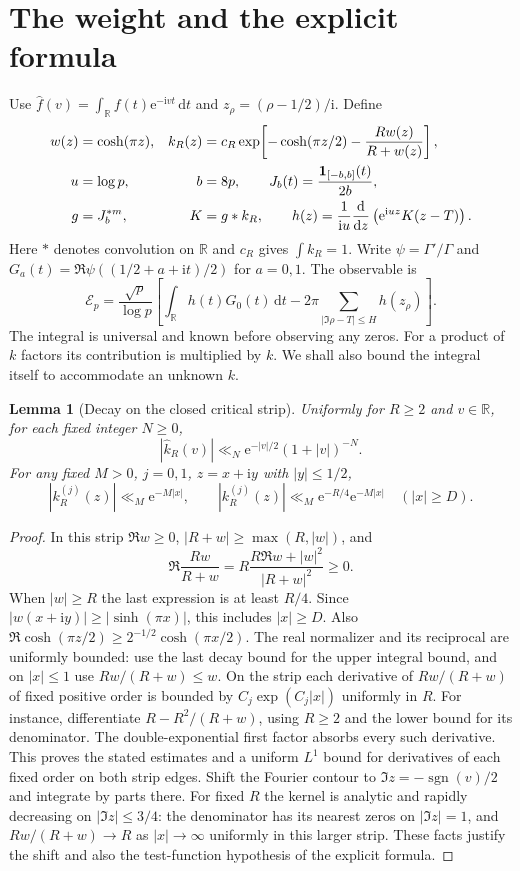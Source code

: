 \documentclass[11pt]{article}
\newtheorem{lemma}[theorem]{Lemma}
\newcommand{\R}{\mathbb R}
\newcommand{\ee}{\mathrm e}
\newcommand{\ii}{\mathrm i}
\newcommand{\dd}{\,\mathrm d}
\newcommand{\wh}{\widehat}
\begin{document}
\section{The weight and the explicit formula}
Use $\wh f(v)=\int_{\R}f(t)\ee^{-\ii vt}\dd t$ and $z_\rho=(\rho-1/2)/\ii$. Define
\begin{align}
 w(z)&=\cosh(\pi z),&
 k_R(z)&=c_R\exp\!\left[-\cosh(\pi z/2)-\frac{Rw(z)}{R+w(z)}\right],
 \label{kernel}\\
 u&=\log p,& b&=8p,\qquad J_b(t)=\frac{\mathbf 1_{[-b,b]}(t)}{2b},\notag\\
 g&=J_b^{*m},& K&=g*k_R,\qquad
 h(z)=\frac{1}{\ii u}\frac{\mathrm d}{\mathrm dz}\left(\ee^{\ii uz}K(z-T)\right).
 \label{hdef}
\end{align}
Here $*$ denotes convolution on $\R$ and $c_R$ gives $\int k_R=1$. Write $\psi=\Gamma'/\Gamma$ and $G_a(t)=\Re\psi((1/2+a+\ii t)/2)$ for $a=0,1$. The observable is
\begin{equation}\label{statistic}
 \boxed{\displaystyle
 \mathcal E_p=\frac{\sqrt p}{\log p}
 \left[\int_{\R} h(t)G_0(t)\dd t
      -2\pi\!\!\sum_{|\Im\rho-T|\le H}h(z_\rho)\right].}
\end{equation}
The integral is universal and known before observing any zeros. For a product of $k$ factors its contribution is multiplied by $k$. We shall also bound the integral itself to accommodate an unknown $k$.

\begin{lemma}[Decay on the closed critical strip]\label{lem:kernel}
Uniformly for $R\ge2$ and $v\in\R$, for each fixed integer $N\ge0$,
\[
 |\wh k_R(v)|\ll_N \ee^{-|v|/2}(1+|v|)^{-N}.
\]
For any fixed $M>0$, $j=0,1$, $z=x+\ii y$ with $|y|\le1/2$,
\[
 |k_R^{(j)}(z)|\ll_M\ee^{-M|x|},\qquad
 |k_R^{(j)}(z)|\ll_M\ee^{-R/4}\ee^{-M|x|}
 \quad (|x|\ge D).
\]
\end{lemma}
\begin{proof}
In this strip $\Re w\ge0$, $|R+w|\ge\max(R,|w|)$, and
\[
 \Re\frac{Rw}{R+w}=R\frac{R\Re w+|w|^2}{|R+w|^2}\ge0.
\]
When $|w|\ge R$ the last expression is at least $R/4$. Since
$|w(x+\ii y)|\ge|\sinh(\pi x)|$, this includes $|x|\ge D$. Also
$\Re\cosh(\pi z/2)\ge2^{-1/2}\cosh(\pi x/2)$.
The real normalizer and its reciprocal are uniformly bounded: use the last decay bound for the upper integral bound, and on $|x|\le1$ use $Rw/(R+w)\le w$. On the strip each derivative of $Rw/(R+w)$ of fixed positive order is bounded by $C_j\exp(C_j|x|)$ uniformly in $R$. For instance, differentiate $R-R^2/(R+w)$, using $R\ge2$ and the lower bound for its denominator. The double-exponential first factor absorbs every such derivative. This proves the stated estimates and a uniform $L^1$ bound for derivatives of each fixed order on both strip edges. Shift the Fourier contour to $\Im z=-\operatorname{sgn}(v)/2$ and integrate by parts there. For fixed $R$ the kernel is analytic and rapidly decreasing on $|\Im z|\le 3/4$: the denominator has its nearest zeros on $|\Im z|=1$, and $Rw/(R+w)\to R$ as $|x|\to\infty$ uniformly in this larger strip. These facts justify the shift and also the test-function hypothesis of the explicit formula.
\end{proof}
\end{document}
